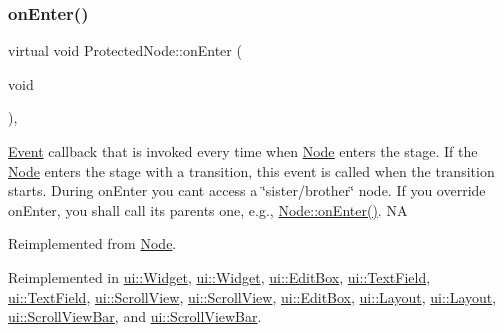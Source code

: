 \subsubsection{\texorpdfstring{on\+Enter()}{onEnter()}\hspace{0.1cm}{\footnotesize\ttfamily [2/2]}}
{\footnotesize\ttfamily virtual void Protected\+Node\+::on\+Enter (\begin{DoxyParamCaption}\item[{void}]{ }\end{DoxyParamCaption})\hspace{0.3cm}{\ttfamily [override]}, {\ttfamily [virtual]}}

\hyperlink{classEvent}{Event} callback that is invoked every time when \hyperlink{classNode}{Node} enters the \textquotesingle{}stage\textquotesingle{}. If the \hyperlink{classNode}{Node} enters the \textquotesingle{}stage\textquotesingle{} with a transition, this event is called when the transition starts. During on\+Enter you can\textquotesingle{}t access a \char`\"{}sister/brother\char`\"{} node. If you override on\+Enter, you shall call its parent\textquotesingle{}s one, e.\+g., \hyperlink{classNode_a7f51764c4afd5018a052b9ef71c03374}{Node\+::on\+Enter()}.  NA 

Reimplemented from \hyperlink{classNode_a7f51764c4afd5018a052b9ef71c03374}{Node}.



Reimplemented in \hyperlink{classui_1_1Widget_a1df4415ad57003db87a5e9b069b56956}{ui\+::\+Widget}, \hyperlink{classui_1_1Widget_a9cda9b9ffbf77a8ed695e6b97b9a46cc}{ui\+::\+Widget}, \hyperlink{classui_1_1EditBox_a0506cfa2b498d2bcd24c4b85deff123d}{ui\+::\+Edit\+Box}, \hyperlink{classui_1_1TextField_a8798bcf6c7f3540b7c078338386c04a3}{ui\+::\+Text\+Field}, \hyperlink{classui_1_1TextField_ad7a8241c7d1a80bc8821e67044ffa20c}{ui\+::\+Text\+Field}, \hyperlink{classui_1_1ScrollView_afeb85b1cf1e420b57a66c97c08763138}{ui\+::\+Scroll\+View}, \hyperlink{classui_1_1ScrollView_a1fb1c9ad9108d8c0102af82bfb7ef66d}{ui\+::\+Scroll\+View}, \hyperlink{classui_1_1EditBox_a04667a919ce4f36fefb7605215267b28}{ui\+::\+Edit\+Box}, \hyperlink{classui_1_1Layout_ad3edf411791596999e99059861c0097a}{ui\+::\+Layout}, \hyperlink{classui_1_1Layout_a13b57bb4cec0d694e8053c393499d8b2}{ui\+::\+Layout}, \hyperlink{classui_1_1ScrollViewBar_a7f0ab392ce00fa9dbb9db54dfbe01e4a}{ui\+::\+Scroll\+View\+Bar}, and \hyperlink{classui_1_1ScrollViewBar_a6cf525ed1ead2a5b8e45de981bf2d0c1}{ui\+::\+Scroll\+View\+Bar}.

\mbox{\label{classProtectedNode_ab424c044446f8c5cf2018e450c4df78c}} 
